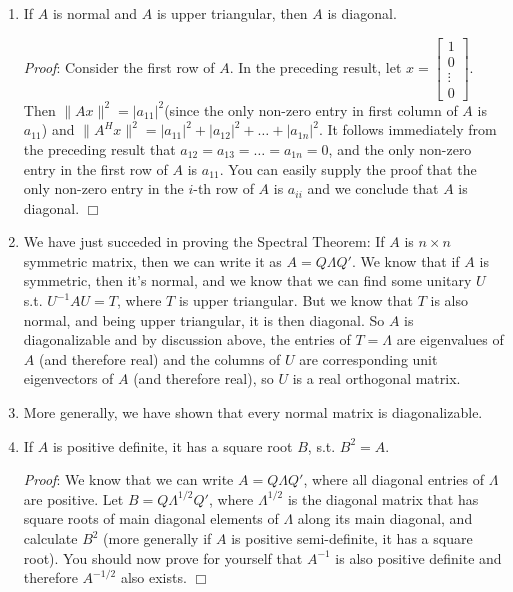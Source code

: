 \documentclass[12pt,oneside]{article}
\begin{document}
\begin{enumerate}
\item If $A$ is normal and $A$ is upper triangular, then $A$ is
  diagonal.

\emph{Proof}: Consider the first row of $A$. In the preceding
  result, let $x = \left[ \begin{array} {c} 1 \\ 0 \\ \vdots \\ 0
  \end{array} \right]$. Then $\|Ax\|^2 = |a_{11}|^2$(since the only
  non-zero entry in first column of $A$ is $a_{11}$) and $\|A^H x\|^2
  = |a_{11}|^2 + |a_{12}|^2 + \ldots + |a_{1n}|^2$. It follows
  immediately from the preceding result that $a_{12} = a_{13} = \ldots
  = a_{1n} = 0$, and the only non-zero entry in the first row of $A$
  is $a_{11}$. You can easily supply the proof that the only non-zero
  entry in the $i$-th row of $A$ is $a_{ii}$ and we conclude that $A$
  is diagonal. $\Box$

\item We have just succeded in proving the Spectral Theorem: If $A$ is
  $n \times n$ symmetric matrix, then we can write it as $A =
  Q \Lambda Q'$. We know that if $A$ is symmetric, then it's normal,
  and we know that we can find some unitary $U$ s.t. $U^{-1} A U = T$,
  where $T$ is upper triangular. But we know that $T$ is also normal,
  and being upper triangular, it is then diagonal. So $A$ is
  diagonalizable and by discussion above, the entries of $T = \Lambda$
  are eigenvalues of $A$ (and therefore real) and the columns of $U$
  are corresponding unit eigenvectors of $A$ (and therefore real), so
  $U$ is a real orthogonal matrix.\

\item More generally, we have shown that every normal matrix is
  diagonalizable.

\item If $A$ is positive definite, it has a square root $B$, s.t. $B^2
  = A$.

\emph{Proof}: We know that we can write $A = Q \Lambda Q'$, where all
  diagonal entries of $\Lambda$ are positive. Let $B = Q \Lambda^{1/2}
  Q'$, where $\Lambda^{1/2}$ is the diagonal matrix that has square
  roots of main diagonal elements of $\Lambda$ along its main
  diagonal, and calculate $B^2$ (more generally if $A$ is positive
  semi-definite, it has a square root). You should now prove for yourself
  that $A^{-1}$ is also positive definite and therefore $A^{-1/2}$
  also exists. $\Box$



\end{enumerate}
\end{document}
